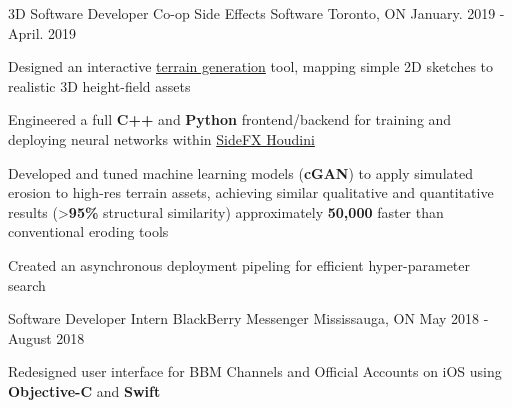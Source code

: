 \begin{cventries}
  \cventry
    {3D Software Developer Co-op} %
    {Side Effects Software} %
    {Toronto, ON} %
    {January. 2019 - April. 2019} %
    {
      \begin{cvitems} %
        \item {Designed an interactive \underline{terrain generation} tool, mapping simple 2D sketches to realistic 3D height-field assets}
        \item {Engineered a full \textbf{C++} and \textbf{Python} frontend/backend for training and deploying neural networks within \underline{SideFX Houdini}}
        \item {Developed and tuned machine learning models (\textbf{cGAN}) to apply simulated erosion to high-res terrain assets, achieving similar qualitative and quantitative results (>\textbf{95\%} structural similarity) approximately \textbf{50,000\times} faster than conventional eroding tools}
        \item {Created an asynchronous deployment pipeling for efficient hyper-parameter search}
      \end{cvitems}
    }

  \cventry
    {Software Developer Intern} %
    {BlackBerry Messenger} %
    {Mississauga, ON} %
    {May 2018 - August 2018} %
    {
      \begin{cvitems} %
        \item {Redesigned user interface for BBM Channels and Official Accounts on iOS using \textbf{Objective-C} and \textbf{Swift}}
      \end{cvitems}
    }

\end{cventries}
